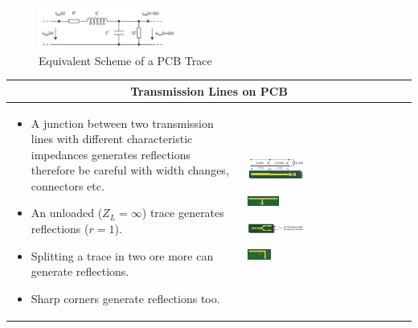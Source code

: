 		\begin{figure}[h]
			\centering
			\includegraphics[width=0.4\textwidth]{images/PCBTrace.png}
			\caption{Equivalent Scheme of a PCB Trace}
			\label{Fig:EqSchemePCBTrace}
		\end{figure}
		
		
		\begin{table}[h!]
		\centering
		\begin{tabular}{|m{}|m{}|}
				\multicolumn{2}{c}{\textbf{Transmission Lines on PCB}}
			\\
			\hline
				\begin{itemize}
					\item A junction between two transmission lines with different characteristic impedances generates reflections therefore be careful with width changes, connectors etc. 
					\item An unloaded ($Z_L = \infty$) trace generates reflections ($r = 1$).
					\item Splitting a trace in two ore more can generate reflections. 
					\item Sharp corners generate reflections too. 
				\end{itemize}
			&
					\begin{center}\includegraphics[width=0.35\textwidth]{images/Junction.png}\end{center} 
					\begin{center}\includegraphics[width=0.2\textwidth]{images/Stub.png}\end{center} 
					\begin{center}\includegraphics[width=0.35\textwidth]{images/ParallelTraces.png}\end{center} 
					\begin{center}\includegraphics[width=0.15\textwidth]{images/Corner.png}\end{center} 
			\\
			\hline
			\end{tabular}
		\end{table}
		
